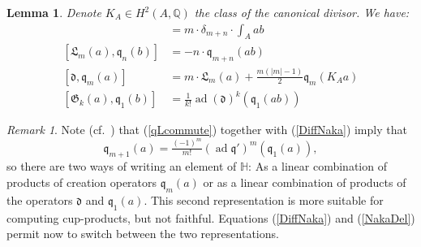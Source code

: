 \documentclass{alggeom}
\DeclareMathOperator{\ad}{ad}
\newcommand{\vac}{|0\rangle}
\newcommand{\G}{\mathfrak{G}}
\newcommand{\q}{\mathfrak{q}}
\renewcommand{\H}{\mathbb{H}}
\newcommand{\Q}{\mathbb{Q}}
\theoremstyle{plain}
\newtheorem{lemma}[theorem]{Lemma}
\theoremstyle{definition}
\theoremstyle{remark}
\newtheorem{remark}[theorem]{Remark}
\begin{document}
\begin{lemma}\cite[Thm.~2.16]{LiQinWang} Denote $K_A\in H^2(A,\Q)$ the class of the canonical divisor. We have:
\label{commutators}
\begin{align}
[\q_m(a), \q_n(b)] &= m\cdot \delta_{m+n} \cdot \int_A ab \\
\label{qLcommute}
[\mathfrak{L}_m(a),\q_n(b)] &= -n\cdot \q_{m+n}(ab) \\
\label{DiffNaka}
[\mathfrak{d},\q_m(a)] &= m \cdot \mathfrak{L}_m(a) + \tfrac{m(|m|-1)}{2} \q_m(K_A a) \\
[\G_k(a),\q_1(b)] &= \tfrac{1}{k!} \ad(\mathfrak{d})^k(\q_1(a b) ) 
\end{align}
\end{lemma}
\begin{remark}\label{HRep}
Note (cf.~\cite[Thm.~3.8]{LehnSorger}) that (\ref{qLcommute}) together with (\ref{DiffNaka}) imply that 
\begin{equation}\label{NakaDel}
\q_{m+1}(a) = \tfrac{(-1)^m}{m!}(\ad\q')^m\left(\q_1(a)\right),
\end{equation}
so there are two ways of writing an element of $\H$: As a linear combination of products of creation operators $\q_m(a)$ or as a linear combination of products of the operators $\mathfrak{d}$ and $\q_1(a)$. This second representation is more suitable for computing cup-products, but not faithful. 
Equations (\ref{DiffNaka}) and (\ref{NakaDel}) permit now to switch between the two representations.
\end{remark}
\end{document}
